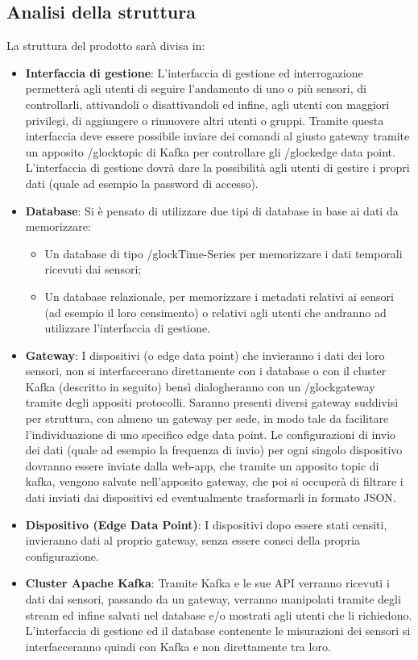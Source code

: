 	\subsection{Analisi della struttura}
		La struttura del prodotto sarà divisa in:
		\begin{itemize}
			\item \textbf{Interfaccia di gestione}: L'interfaccia di gestione ed interrogazione permetterà agli utenti di seguire l'andamento di uno o più sensori, di controllarli, attivandoli o disattivandoli ed infine, agli utenti con maggiori privilegi, di aggiungere o rimuovere altri utenti o gruppi.
			Tramite questa interfaccia deve essere possibile inviare dei comandi al giusto gateway tramite un apposito /glock{topic} di Kafka per controllare gli /glock{edge data point}. 
			L'interfaccia di gestione dovrà dare la possibilità agli utenti di gestire i propri dati (quale ad esempio la password di accesso).
			\item \textbf{Database}: Si è pensato di utilizzare due tipi di database in base ai dati da memorizzare:
			\begin{itemize}
				\item Un database di tipo /glock{Time-Series} per memorizzare i dati temporali ricevuti dai sensori;
				\item Un database relazionale, per memorizzare i metadati relativi ai sensori (ad esempio il loro censimento) o relativi agli utenti che andranno ad utilizzare l'interfaccia di gestione.
			\end{itemize}

			\item \textbf{Gateway}: I dispositivi (o edge data point) che invieranno i dati dei loro sensori, non si interfaccerano direttamente con i database o con il cluster Kafka (descritto in seguito) bensì dialogheranno con un /glock{gateway} tramite degli appositi protocolli.
			Saranno presenti diversi gateway suddivisi per struttura, con almeno un gateway per sede, in modo tale da facilitare l'individuazione di uno specifico edge data point.
			Le configurazioni di invio dei dati (quale ad esempio la frequenza di invio) per ogni singolo dispositivo dovranno essere inviate dalla web-app, che tramite un apposito topic di kafka, vengono salvate nell'apposito gateway, che poi si occuperà di filtrare i dati inviati dai dispositivi ed eventualmente trasformarli in formato JSON. 

			\item \textbf{Dispositivo (Edge Data Point)}: I dispositivi dopo essere stati censiti, invieranno dati al proprio gateway, senza essere consci della propria configurazione.

			\item \textbf{Cluster Apache Kafka}: Tramite Kafka e le sue API verranno ricevuti i dati dai sensori, passando da un gateway, verranno manipolati tramite degli stream ed infine salvati nel database e/o mostrati agli utenti che li richiedono. L'interfaccia di gestione ed il database contenente le misurazioni dei sensori si interfacceranno quindi con Kafka e non direttamente tra loro.

		\end{itemize}
